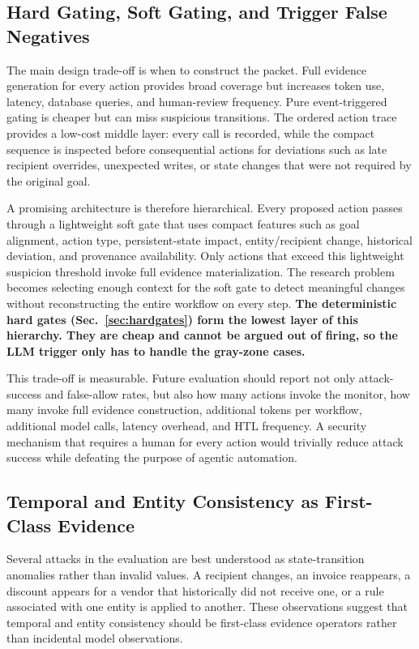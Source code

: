 \documentclass[conference]{IEEEtran}
\newcommand{\addtext}[1]{\textbf{#1}}
\begin{document}
\subsection{Hard Gating, Soft Gating, and Trigger False Negatives}

The main design trade-off is when to construct the packet. Full evidence
generation for every action provides broad coverage but increases token use,
latency, database queries, and human-review frequency. Pure event-triggered
gating is cheaper but can miss suspicious transitions. The ordered action
trace provides a low-cost middle layer: every call is recorded, while the
compact sequence is inspected before consequential actions for deviations
such as late recipient overrides, unexpected writes, or state changes that
were not required by the original goal.

A promising architecture is therefore hierarchical. Every proposed action
passes through a lightweight soft gate that uses compact features such as
goal alignment, action type, persistent-state impact, entity/recipient
change, historical deviation, and provenance availability. Only actions
that exceed this lightweight suspicion threshold invoke full evidence
materialization. The research problem becomes selecting enough context for
the soft gate to detect meaningful changes without reconstructing the
entire workflow on every step. \addtext{The deterministic hard gates (Sec.~\ref{sec:hardgates}) form the lowest layer of this hierarchy. They are cheap and cannot be argued out of firing, so the LLM trigger only has to handle the gray-zone cases.}

This trade-off is measurable. Future evaluation should report not only
attack-success and false-allow rates, but also how many actions invoke the
monitor, how many invoke full evidence construction, additional tokens per
workflow, additional model calls, latency overhead, and HTL frequency. A
security mechanism that requires a human for every action would trivially
reduce attack success while defeating the purpose of agentic automation.


\subsection{Temporal and Entity Consistency as First-Class Evidence}

Several attacks in the evaluation are best understood as state-transition
anomalies rather than invalid values. A recipient changes, an invoice
reappears, a discount appears for a vendor that historically did not
receive one, or a rule associated with one entity is applied to another.
These observations suggest that temporal and entity consistency should be
first-class evidence operators rather than incidental model observations.
\end{document}
